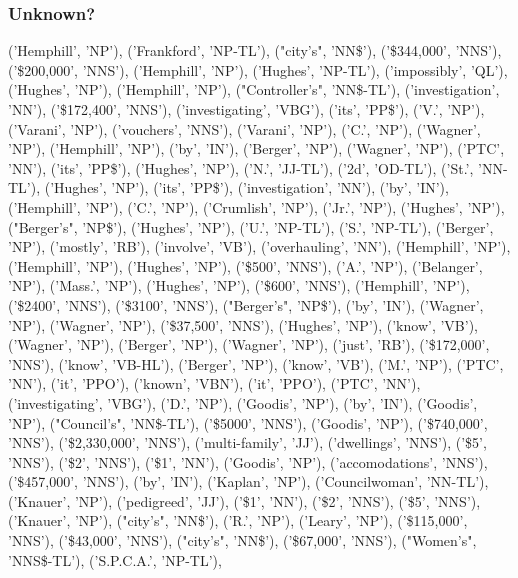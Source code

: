 \documentclass[10pt]{beamer}
\begin{document}
\begin{frame}[fragile]
  \frametitle{Unknown?}
  

  ('Hemphill', 'NP'), ('Frankford', 'NP-TL'), ("city's", 'NN\$'), ('\$344,000', 'NNS'), ('\$200,000', 'NNS'), ('Hemphill', 'NP'), ('Hughes', 'NP-TL'), ('impossibly', 'QL'), ('Hughes', 'NP'), ('Hemphill', 'NP'), ("Controller's", 'NN\$-TL'), ('investigation', 'NN'), ('\$172,400', 'NNS'), ('investigating', 'VBG'), ('its', 'PP\$'), ('V.', 'NP'), ('Varani', 'NP'), ('vouchers', 'NNS'), ('Varani', 'NP'), ('C.', 'NP'), ('Wagner', 'NP'), ('Hemphill', 'NP'), ('by', 'IN'), ('Berger', 'NP'), ('Wagner', 'NP'), ('PTC', 'NN'), ('its', 'PP\$'), ('Hughes', 'NP'), ('N.', 'JJ-TL'), ('2d', 'OD-TL'), ('St.', 'NN-TL'), ('Hughes', 'NP'), ('its', 'PP\$'), ('investigation', 'NN'), ('by', 'IN'), ('Hemphill', 'NP'), ('C.', 'NP'), ('Crumlish', 'NP'), ('Jr.', 'NP'), ('Hughes', 'NP'), ("Berger's", 'NP\$'), ('Hughes', 'NP'), ('U.', 'NP-TL'), ('S.', 'NP-TL'), ('Berger', 'NP'), ('mostly', 'RB'), ('involve', 'VB'), ('overhauling', 'NN'), ('Hemphill', 'NP'), ('Hemphill', 'NP'), ('Hughes', 'NP'), ('\$500', 'NNS'), ('A.', 'NP'), ('Belanger', 'NP'), ('Mass.', 'NP'), ('Hughes', 'NP'), ('\$600', 'NNS'), ('Hemphill', 'NP'), ('\$2400', 'NNS'), ('\$3100', 'NNS'), ("Berger's", 'NP\$'), ('by', 'IN'), ('Wagner', 'NP'), ('Wagner', 'NP'), ('\$37,500', 'NNS'), ('Hughes', 'NP'), ('know', 'VB'), ('Wagner', 'NP'), ('Berger', 'NP'), ('Wagner', 'NP'), ('just', 'RB'), ('\$172,000', 'NNS'), ('know', 'VB-HL'), ('Berger', 'NP'), ('know', 'VB'), ('M.', 'NP'), ('PTC', 'NN'), ('it', 'PPO'), ('known', 'VBN'), ('it', 'PPO'), ('PTC', 'NN'), ('investigating', 'VBG'), ('D.', 'NP'), ('Goodis', 'NP'), ('by', 'IN'), ('Goodis', 'NP'), ("Council's", 'NN\$-TL'), ('\$5000', 'NNS'), ('Goodis', 'NP'), ('\$740,000', 'NNS'), ('\$2,330,000', 'NNS'), ('multi-family', 'JJ'), ('dwellings', 'NNS'), ('\$5', 'NNS'), ('\$2', 'NNS'), ('\$1', 'NN'), ('Goodis', 'NP'), ('accomodations', 'NNS'), ('\$457,000', 'NNS'), ('by', 'IN'), ('Kaplan', 'NP'), ('Councilwoman', 'NN-TL'), ('Knauer', 'NP'), ('pedigreed', 'JJ'), ('\$1', 'NN'), ('\$2', 'NNS'), ('\$5', 'NNS'), ('Knauer', 'NP'), ("city's", 'NN\$'), ('R.', 'NP'), ('Leary', 'NP'), ('\$115,000', 'NNS'), ('\$43,000', 'NNS'), ("city's", 'NN\$'), ('\$67,000', 'NNS'), ("Women's", 'NNS\$-TL'), ('S.P.C.A.', 'NP-TL'),

  
\end{frame}
\end{document}
